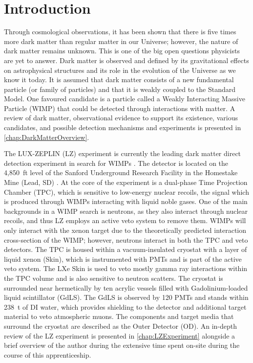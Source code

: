 \chapter{Introduction}
Through cosmological observations, it has been shown that there is five times more dark matter than regular matter in our Universe; however, the nature of dark matter remains unknown. This is one of the big open questions physicists are yet to answer. Dark matter is observed and defined by its gravitational effects on astrophysical structures and its role in the evolution of the Universe as we know it today. It is assumed that dark matter consists of a new fundamental particle (or family of particles) and that it is weakly coupled to the Standard Model. One favoured candidate is a particle called a Weakly Interacting Massive Particle (WIMP) that could be detected through interactions with matter. A review of dark matter, observational evidence to support its existence, various candidates, and possible detection mechanisms and experiments is presented in \autoref{chap:DarkMatterOverview}.

The LUX-ZEPLIN (LZ) experiment is currently the leading dark matter direct detection experiment in search for WIMPs \cite{LZCollaboration:2024lux}. The detector is located on the 4,850~ft level of the Sanford Underground Research Facility in the Homestake Mine (Lead, SD) \cite{LZNIMA}. At the core of the experiment is a dual-phase Time Projection Chamber (TPC), which is sensitive to low-energy nuclear recoils, the signal which is produced through WIMPs interacting with liquid noble gases. One of the main backgrounds in a WIMP search is neutrons, as they also interact through nuclear recoils, and thus LZ employs an active veto system to remove them. WIMPs will only interact with the xenon target due to the theoretically predicted interaction cross-section of the WIMP; however, neutrons interact in both the TPC and veto detectors. The TPC is housed within a vacuum-insulated cryostat with a layer of liquid xenon (Skin), which is instrumented with PMTs and is part of the active veto system. The LXe Skin is used to veto mostly gamma ray interactions within the TPC volume and is also sensitive to neutron scatters. The cryostat is surrounded near hermetically by ten acrylic vessels filled with Gadolinium-loaded liquid scintillator (GdLS). The GdLS is observed by 120 PMTs and stands within 238~t of DI water, which provides shielding to the detector and additional target material to veto atmospheric muons. The components and target media that surround the cryostat are described as the Outer Detector (OD). An in-depth review of the LZ experiment is presented in \autoref{chap:LZExperiment} alongside a brief overview of the author during the extensive time spent on-site during the course of this apprenticeship. 

